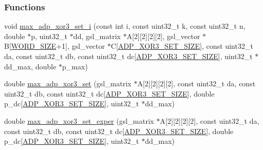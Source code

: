 \subsubsection*{\-Functions}
\begin{DoxyCompactItemize}
\item 
void \hyperlink{max-adp-xor3-set_8cc_a338bdbbb9210c9ed8cc6c053ab42aa68}{max\-\_\-adp\-\_\-xor3\-\_\-set\-\_\-i} (const int i, const uint32\-\_\-t k, const uint32\-\_\-t n, double $\ast$p, uint32\-\_\-t $\ast$dd, gsl\-\_\-matrix $\ast$\-A\mbox{[}2\mbox{]}\mbox{[}2\mbox{]}\mbox{[}2\mbox{]}\mbox{[}2\mbox{]}, gsl\-\_\-vector $\ast$\-B\mbox{[}\hyperlink{common_8hh_a92ed8507d1cd2331ad09275c5c4c1c89}{\-W\-O\-R\-D\-\_\-\-S\-I\-Z\-E}+1\mbox{]}, gsl\-\_\-vector $\ast$\-C\mbox{[}\hyperlink{max-adp-xor3-set_8hh_a6b52658f2068b1daef8ed31dd70ead0c}{\-A\-D\-P\-\_\-\-X\-O\-R3\-\_\-\-S\-E\-T\-\_\-\-S\-I\-Z\-E}\mbox{]}, const uint32\-\_\-t da, const uint32\-\_\-t db, const uint32\-\_\-t dc\mbox{[}\hyperlink{max-adp-xor3-set_8hh_a6b52658f2068b1daef8ed31dd70ead0c}{\-A\-D\-P\-\_\-\-X\-O\-R3\-\_\-\-S\-E\-T\-\_\-\-S\-I\-Z\-E}\mbox{]}, uint32\-\_\-t $\ast$dd\-\_\-max, double $\ast$p\-\_\-max)
\item 
double \hyperlink{max-adp-xor3-set_8cc_a64619e5349dd07dc017b0469b4066fce}{max\-\_\-adp\-\_\-xor3\-\_\-set} (gsl\-\_\-matrix $\ast$\-A\mbox{[}2\mbox{]}\mbox{[}2\mbox{]}\mbox{[}2\mbox{]}\mbox{[}2\mbox{]}, const uint32\-\_\-t da, const uint32\-\_\-t db, const uint32\-\_\-t dc\mbox{[}\hyperlink{max-adp-xor3-set_8hh_a6b52658f2068b1daef8ed31dd70ead0c}{\-A\-D\-P\-\_\-\-X\-O\-R3\-\_\-\-S\-E\-T\-\_\-\-S\-I\-Z\-E}\mbox{]}, double p\-\_\-dc\mbox{[}\hyperlink{max-adp-xor3-set_8hh_a6b52658f2068b1daef8ed31dd70ead0c}{\-A\-D\-P\-\_\-\-X\-O\-R3\-\_\-\-S\-E\-T\-\_\-\-S\-I\-Z\-E}\mbox{]}, uint32\-\_\-t $\ast$dd\-\_\-max)
\item 
double \hyperlink{max-adp-xor3-set_8cc_a0a37e7b1b1aed6c625c2c64f9fc710f6}{max\-\_\-adp\-\_\-xor3\-\_\-set\-\_\-exper} (gsl\-\_\-matrix $\ast$\-A\mbox{[}2\mbox{]}\mbox{[}2\mbox{]}\mbox{[}2\mbox{]}\mbox{[}2\mbox{]}, const uint32\-\_\-t da, const uint32\-\_\-t db, const uint32\-\_\-t dc\mbox{[}\hyperlink{max-adp-xor3-set_8hh_a6b52658f2068b1daef8ed31dd70ead0c}{\-A\-D\-P\-\_\-\-X\-O\-R3\-\_\-\-S\-E\-T\-\_\-\-S\-I\-Z\-E}\mbox{]}, double p\-\_\-dc\mbox{[}\hyperlink{max-adp-xor3-set_8hh_a6b52658f2068b1daef8ed31dd70ead0c}{\-A\-D\-P\-\_\-\-X\-O\-R3\-\_\-\-S\-E\-T\-\_\-\-S\-I\-Z\-E}\mbox{]}, uint32\-\_\-t $\ast$dd\-\_\-max)
\end{DoxyCompactItemize}


